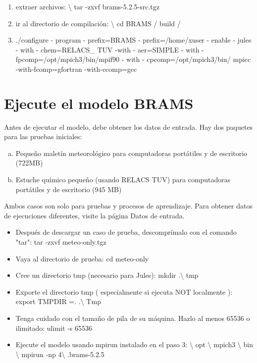 \documentclass[12pt,letterpaper]{article}
\begin{document}
\begin{enumerate}
\item extraer archivos:  \textbackslash{} tar -zxvf brams-5.2.5-src.tgz
\item ir al directorio de compilación:  \textbackslash{} cd BRAMS / build /
\item ./configure - program - prefix=BRAMS - prefix=/home/xuser - enable - jules - with - chem=RELACS\_ TUV -with - aer=SIMPLE - with - fpcomp=/opt/mpich3/bin/mpif90 - with - cpcomp=/opt/mpich3/bin/ mpicc -with-fcomp=gfortran -with-ccomp=gcc
\end{enumerate}

\section{Ejecute el modelo BRAMS}
Antes de ejecutar el modelo, debe obtener los datos de entrada. Hay dos paquetes para las pruebas iniciales:

\begin{enumerate}[a)]
\item  Pequeño maletín meteorológico para computadoras portátiles y de escritorio (722MB)
\item Estuche químico pequeño (usando RELACS TUV) para computadoras portátiles y de escritorio (945 MB)

\end{enumerate}
Ambos casos son solo para pruebas y procesos de aprendizaje. Para obtener datos de ejecuciones diferentes, visite la página Datos de entrada.

\begin{itemize}
\item Después de descargar un caso de prueba, descomprímalo con el comando "tar":  tar -zxvf meteo-only.tgz
\item Vaya al directorio de prueba:  cd meteo-only
\item Cree un directorio tmp (necesario para Jules):  mkdir .\textbackslash{} tmp
\item Exporte el directorio tmp ( especialmente si ejecuta NOT localmente ):  export TMPDIR =. .\textbackslash{} Tmp
\item Tenga cuidado con el tamaño de pila de su máquina. Hazlo al menos 65536 o ilimitado:  ulimit -s 65536
\item Ejecute el modelo usando mpirun instalado en el paso 3:  \textbackslash{} opt \textbackslash{} mpich3 \textbackslash{} bin \textbackslash{} mpirun -np 4\textbackslash{} .brams-5.2.5
\end{itemize}
\end{document}
